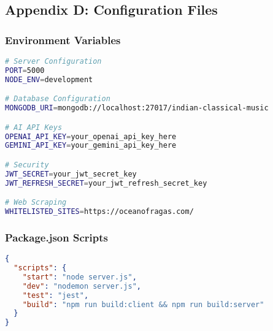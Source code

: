\documentclass[12pt,a4paper]{article}
\begin{document}
\subsection{Appendix D: Configuration Files}

\subsubsection{Environment Variables}
\begin{lstlisting}[language=bash]
# Server Configuration
PORT=5000
NODE_ENV=development

# Database Configuration
MONGODB_URI=mongodb://localhost:27017/indian-classical-music

# AI API Keys
OPENAI_API_KEY=your_openai_api_key_here
GEMINI_API_KEY=your_gemini_api_key_here

# Security
JWT_SECRET=your_jwt_secret_key
JWT_REFRESH_SECRET=your_jwt_refresh_secret_key

# Web Scraping
WHITELISTED_SITES=https://oceanofragas.com/
\end{lstlisting}

\subsubsection{Package.json Scripts}
\begin{lstlisting}[language=JSON]
{
  "scripts": {
    "start": "node server.js",
    "dev": "nodemon server.js",
    "test": "jest",
    "build": "npm run build:client && npm run build:server"
  }
}
\end{lstlisting}
\end{document}
